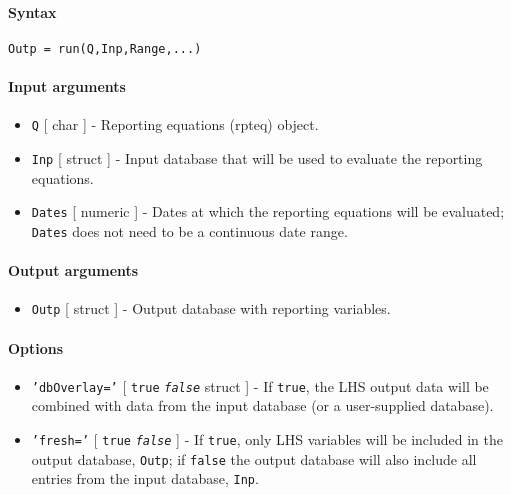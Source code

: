 


	\paragraph{Syntax}

\begin{verbatim}
Outp = run(Q,Inp,Range,...)
\end{verbatim}

\paragraph{Input arguments}

\begin{itemize}
\item
  \texttt{Q} {[} char {]} - Reporting equations (rpteq) object.
\item
  \texttt{Inp} {[} struct {]} - Input database that will be used to
  evaluate the reporting equations.
\item
  \texttt{Dates} {[} numeric {]} - Dates at which the reporting
  equations will be evaluated; \texttt{Dates} does not need to be a
  continuous date range.
\end{itemize}

\paragraph{Output arguments}

\begin{itemize}
\itemsep1pt\parskip0pt
\item
  \texttt{Outp} {[} struct {]} - Output database with reporting
  variables.
\end{itemize}

\paragraph{Options}

\begin{itemize}
\item
  \texttt{'dbOverlay='} {[} \texttt{true} \textbar{}
  \emph{\texttt{false}} \textbar{} struct {]} - If \texttt{true}, the
  LHS output data will be combined with data from the input database (or
  a user-supplied database).
\item
  \texttt{'fresh='} {[} \texttt{true} \textbar{} \emph{\texttt{false}}
  {]} - If \texttt{true}, only LHS variables will be included in the
  output database, \texttt{Outp}; if \texttt{false} the output database
  will also include all entries from the input database, \texttt{Inp}.
\end{itemize}

